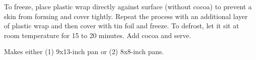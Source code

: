 \begin{recipe}
	\suggestion
	{
		To freeze, place plastic wrap directly against surface (without cocoa) to prevent a skin from forming and cover tightly. Repeat the process with an additional layer of plastic wrap and then cover with tin foil and freeze. To defrost, let it sit at room temperature for 15 to 20 minutes. Add cocoa and serve. 
	}
	
	\hint
	{
		Makes either (1) 9x13-inch pan or (2) 8x8-inch pans. 		
	}

\end{recipe}
